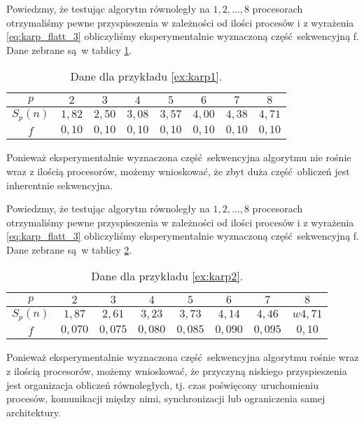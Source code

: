 \begin{przyklad}\label{ex:karp1}
Powiedzmy, że testując algorytm równoległy na \(1, 2, \dots, 8\) procesorach otrzymaliśmy pewne przyspieszenia w zależności od ilości procesów i z wyrażenia \ref{eq:karp_flatt_3} obliczyliśmy eksperymentalnie wyznaczoną część sekwencyjną f. Dane zebrane są w tablicy \ref{tab:karp_flat1}.

\begin{table}[H]
\centering
\begin{tabular}{|c|c|c|c|c|c|c|c|}
\hline
\(p\) & \(2\) & \(3\) & \(4\) & \(5\) & \(6\) & \(7\) & \(8\) \\
\hline
\(S_p(n)\) & \(1,82\) & \(2,50\) & \(3,08\) & \(3,57\) & \(4,00\) & \(4,38\) & \(4,71\) \\
\hline
\(f\) & \(0,10\) & \(0,10\) & \(0,10\) & \(0,10\) & \(0,10\) & \(0,10\) & \(0,10\) \\
\hline
\end{tabular}
\caption{Dane dla przykładu \ref{ex:karp1}.}
\label{tab:karp_flat1}
\end{table}

Ponieważ eksperymentalnie wyznaczona część sekwencyjna algorytmu nie rośnie wraz z ilością procesorów, możemy wnioskować, że zbyt duża część obliczeń jest inherentnie sekwencyjna.
\end{przyklad}

\begin{przyklad}\label{ex:karp2}
Powiedzmy, że testując algorytm równoległy na \(1, 2, \dots, 8\) procesorach otrzymaliśmy pewne przyspieszenia w zależności od ilości procesów i z wyrażenia \ref{eq:karp_flatt_3} obliczyliśmy eksperymentalnie wyznaczoną część sekwencyjną f. Dane zebrane są w tablicy \ref{tab:karp_flat2}.

\begin{table}[H]
\centering
\begin{tabular}{|c|c|c|c|c|c|c|c|}
\hline
\(p\) & \(2\) & \(3\) & \(4\) & \(5\) & \(6\) & \(7\) & \(8\) \\
\hline
\(S_p(n)\) & \(1,87\) & \(2,61\) & \(3,23\) & \(3,73\) & \(4,14\) & \(4,46\) & \(w4,71\) \\
\hline
\(f\) & \(0,070\) & \(0,075\) & \(0,080\) & \(0,085\) & \(0,090\) & \(0,095\) & \(0,10\) \\
\hline
\end{tabular}
\caption{Dane dla przykładu \ref{ex:karp2}.}
\label{tab:karp_flat2}
\end{table}
Ponieważ eksperymentalnie wyznaczona część sekwencyjna algorytmu rośnie wraz z ilością procesorów, możemy wnioskować, że przyczyną niskiego przyspieszenia jest organizacja obliczeń równoległych, tj. czas poświęcony uruchomieniu procesów, komunikacji między nimi, synchronizacji lub ograniczenia samej architektury.
\end{przyklad}